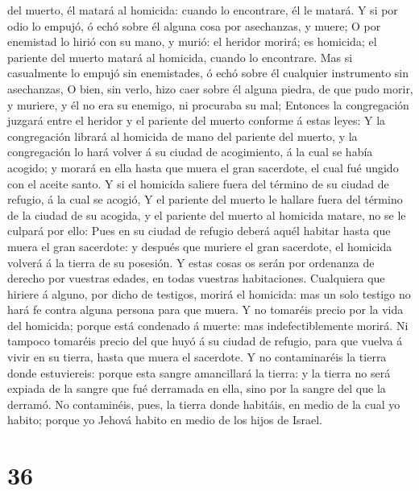 del muerto, él matará al homicida: cuando lo encontrare, él le matará.
 Y si por odio lo empujó, ó echó sobre él alguna cosa por
asechanzas, y muere;  O por enemistad lo hirió con su
mano, y murió: el heridor morirá; es homicida; el pariente del muerto
matará al homicida, cuando lo encontrare.  Mas si
casualmente lo empujó sin enemistades, ó echó sobre él cualquier
instrumento sin asechanzas,  O bien, sin verlo, hizo caer
sobre él alguna piedra, de que pudo morir, y muriere, y él no era su
enemigo, ni procuraba su mal;  Entonces la congregación
juzgará entre el heridor y el pariente del muerto conforme á estas
leyes:  Y la congregación librará al homicida de mano del
pariente del muerto, y la congregación lo hará volver á su ciudad de
acogimiento, á la cual se había acogido; y morará en ella hasta que
muera el gran sacerdote, el cual fué ungido con el aceite santo.
 Y si el homicida saliere fuera del término de su ciudad
de refugio, á la cual se acogió,  Y el pariente del
muerto le hallare fuera del término de la ciudad de su acogida, y el
pariente del muerto al homicida matare, no se le culpará por ello:
 Pues en su ciudad de refugio deberá aquél habitar hasta
que muera el gran sacerdote: y después que muriere el gran sacerdote, el
homicida volverá á la tierra de su posesión.  Y estas
cosas os serán por ordenanza de derecho por vuestras edades, en todas
vuestras habitaciones.  Cualquiera que hiriere á alguno,
por dicho de testigos, morirá el homicida: mas un solo testigo no hará
fe contra alguna persona para que muera.  Y no tomaréis
precio por la vida del homicida; porque está condenado á muerte: mas
indefectiblemente morirá.  Ni tampoco tomaréis precio del
que huyó á su ciudad de refugio, para que vuelva á vivir en su tierra,
hasta que muera el sacerdote.  Y no contaminaréis la
tierra donde estuviereis: porque esta sangre amancillará la tierra: y la
tierra no será expiada de la sangre que fué derramada en ella, sino por
la sangre del que la derramó.  No contaminéis, pues, la
tierra donde habitáis, en medio de la cual yo habito; porque yo Jehová
habito en medio de los hijos de Israel.

\hypertarget{section-35}{%
\section{36}\label{section-35}}

